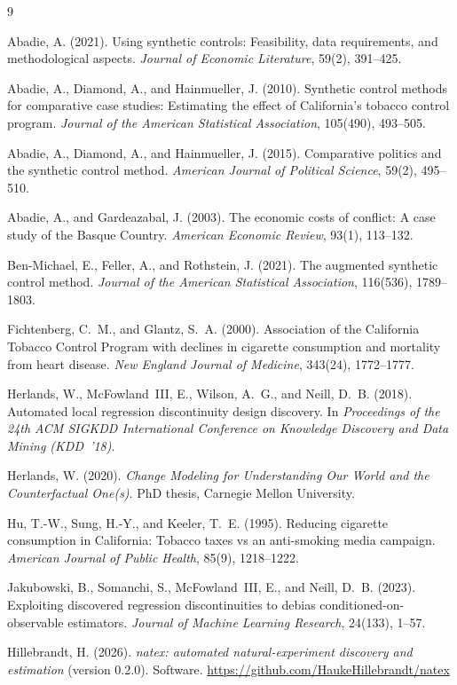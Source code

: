 \documentclass[11pt]{article}
\begin{document}
\scriptsize
\begin{thebibliography}{9}
\setlength{\itemsep}{1pt}\setlength{\parskip}{0pt}

Abadie, A. (2021).
Using synthetic controls: Feasibility, data requirements, and methodological
aspects.
\emph{Journal of Economic Literature}, 59(2), 391--425.

Abadie, A., Diamond, A., and Hainmueller, J. (2010).
Synthetic control methods for comparative case studies: Estimating the effect
of California's tobacco control program.
\emph{Journal of the American Statistical Association}, 105(490), 493--505.

Abadie, A., Diamond, A., and Hainmueller, J. (2015).
Comparative politics and the synthetic control method.
\emph{American Journal of Political Science}, 59(2), 495--510.

Abadie, A., and Gardeazabal, J. (2003).
The economic costs of conflict: A case study of the Basque Country.
\emph{American Economic Review}, 93(1), 113--132.

Ben-Michael, E., Feller, A., and Rothstein, J. (2021).
The augmented synthetic control method.
\emph{Journal of the American Statistical Association}, 116(536), 1789--1803.

Fichtenberg, C.~M., and Glantz, S.~A. (2000).
Association of the California Tobacco Control Program with declines in
cigarette consumption and mortality from heart disease.
\emph{New England Journal of Medicine}, 343(24), 1772--1777.

Herlands, W., McFowland~III, E., Wilson, A.~G., and Neill, D.~B. (2018).
Automated local regression discontinuity design discovery.
In \emph{Proceedings of the 24th ACM SIGKDD International Conference on Knowledge
Discovery and Data Mining (KDD~'18)}.

Herlands, W. (2020).
\emph{Change Modeling for Understanding Our World and the Counterfactual
One(s)}.
PhD thesis, Carnegie Mellon University.

Hu, T.-W., Sung, H.-Y., and Keeler, T.~E. (1995).
Reducing cigarette consumption in California: Tobacco taxes vs an
anti-smoking media campaign.
\emph{American Journal of Public Health}, 85(9), 1218--1222.

Jakubowski, B., Somanchi, S., McFowland~III, E., and Neill, D.~B. (2023).
Exploiting discovered regression discontinuities to debias
conditioned-on-observable estimators.
\emph{Journal of Machine Learning Research}, 24(133), 1--57.

Hillebrandt, H. (2026).
\emph{natex: automated natural-experiment discovery and estimation} (version
0.2.0). Software.
\url{https://github.com/HaukeHillebrandt/natex}

\end{thebibliography}
\end{document}
